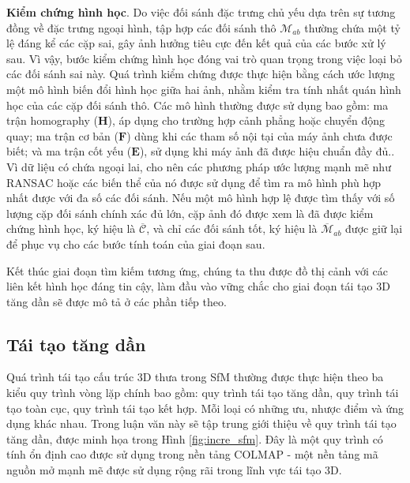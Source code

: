 \textbf{Kiểm chứng hình học}. Do việc đối sánh đặc trưng chủ yếu dựa trên sự tương đồng về đặc trưng ngoại hình, tập hợp các đối sánh thô $\mathcal{M}_{ab}$ thường chứa một tỷ lệ đáng kể các cặp sai, gây ảnh hưởng tiêu cực đến kết quả của các bước xử lý sau. Vì vậy, bước kiểm chứng hình học đóng vai trò quan trọng trong việc loại bỏ các đối sánh sai này. Quá trình kiểm chứng được thực hiện bằng cách ước lượng một mô hình biến đổi hình học giữa hai ảnh, nhằm kiểm tra tính nhất quán hình học của các cặp đối sánh thô. Các mô hình thường được sử dụng bao gồm: ma trận homography ($\mathbf{H}$), áp dụng cho trường hợp cảnh phẳng hoặc chuyển động quay; ma trận cơ bản ($\mathbf{F}$) dùng khi các tham số nội tại của máy ảnh chưa được biết; và ma trận cốt yếu ($\mathbf{E}$), sử dụng khi máy ảnh đã được hiệu chuẩn đầy đủ.\cite{Hartley03Multiple}. Vì dữ liệu có chứa ngoại lai, cho nên các phương pháp ước lượng mạnh mẽ như RANSAC \cite{Fischler81RANSAC} hoặc các biến thể của nó được sử dụng để tìm ra mô hình phù hợp nhất được với đa số các đối sánh. Nếu một mô hình hợp lệ được tìm thấy với số lượng cặp đối sánh chính xác đủ lớn, cặp ảnh đó được xem là đã được kiểm chứng hình học, ký hiệu là $\overline{\mathcal{C}}$, và chỉ các đối sánh tốt, ký hiệu là $\overline{\mathcal{M}}_{ab}$ được giữ lại để phục vụ cho các bước tính toán của giai đoạn sau.

Kết thúc giai đoạn tìm kiếm tương ứng, chúng ta thu được đồ thị cảnh với các liên kết hình học đáng tin cậy, làm đầu vào vững chắc cho giai đoạn tái tạo 3D tăng dần sẽ được mô tả ở các phần tiếp theo.

\subsection{Tái tạo tăng dần} 
\label{subsec:incremental_reconstruction} 
    
Quá trình tái tạo cấu trúc 3D thưa trong SfM thường được thực hiện theo ba kiểu quy trình vòng lặp chính bao gồm: quy trình tái tạo tăng dần, quy trình tái tạo toàn cục, quy trình tái tạo kết hợp. Mỗi loại có những ưu, nhược điểm và ứng dụng khác nhau. Trong luận văn này sẽ tập trung giới thiệu về quy trình tái tạo tăng dần, được minh họa trong Hình \ref{fig:incre_sfm}. Đây là một quy trình có tính ổn định cao được sử dụng trong nền tảng COLMAP - một nền tảng mã nguồn mở mạnh mẽ được sử dụng rộng rãi trong lĩnh vực tái tạo 3D.

